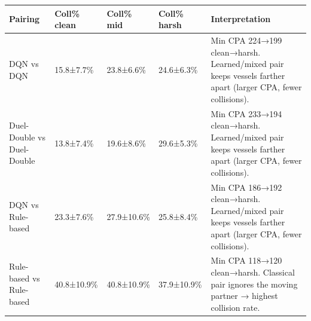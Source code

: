 \begin{tabular}{lllll}
\toprule
Pairing & Coll\% clean & Coll\% mid & Coll\% harsh & Interpretation \\
\midrule
DQN vs DQN & 15.8±7.7\% & 23.8±6.6\% & 24.6±6.3\% & Min CPA 224→199 clean→harsh. Learned/mixed pair keeps vessels farther apart (larger CPA, fewer collisions). \\
Duel-Double vs Duel-Double & 13.8±7.4\% & 19.6±8.6\% & 29.6±5.3\% & Min CPA 233→194 clean→harsh. Learned/mixed pair keeps vessels farther apart (larger CPA, fewer collisions). \\
DQN vs Rule-based & 23.3±7.6\% & 27.9±10.6\% & 25.8±8.4\% & Min CPA 186→192 clean→harsh. Learned/mixed pair keeps vessels farther apart (larger CPA, fewer collisions). \\
Rule-based vs Rule-based & 40.8±10.9\% & 40.8±10.9\% & 37.9±10.9\% & Min CPA 118→120 clean→harsh. Classical pair ignores the moving partner → highest collision rate. \\
\bottomrule
\end{tabular}
